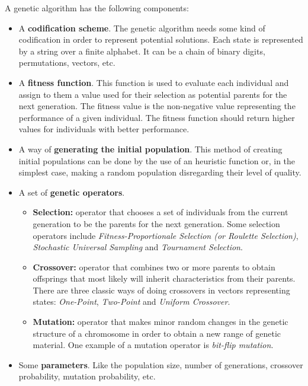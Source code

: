\documentclass[]{llncs}
\begin{document}
A genetic algorithm has the following components:
\begin{itemize}
    \item A \textbf{codification scheme}. The genetic algorithm needs some kind of codification in order to represent potential solutions. Each state is represented by a string over a finite alphabet. It can be a chain of binary digits, permutations, vectors, etc. 
    \item A \textbf{fitness function}. This function is used to evaluate each individual and assign to them a value used for their selection as potential parents for the next generation. The fitness value is the non-negative value representing the performance of a given individual. The fitness function should return higher values for individuals with better performance.
    \item A way of \textbf{generating the initial population}. This method of creating initial populations can be done by the use of an heuristic function or, in the simplest case, making a random population disregarding their level of quality.
    \item A set of \textbf{genetic operators}. 
    \begin{itemize}
        \item \textbf{Selection:} operator that chooses a set of individuals from the current generation to be the parents for the next generation. Some selection operators include \textit{Fitness-Proportionale Selection (or Roulette Selection)}, \textit{Stochastic Universal Sampling} and \textit{Tournament Selection}.
        \item \textbf{Crossover:} operator that combines two or more parents to obtain offsprings that most likely will inherit characteristics from their parents. There are three classic ways of doing crossovers in vectors representing states: \textit{One-Point}, \textit{Two-Point} and \textit{Uniform Crossover}.
        \item \textbf{Mutation:} operator that makes minor random changes in the genetic structure of a chromosome in order to obtain a new range of genetic material. One example of a mutation operator is \textit{bit-flip mutation}.
    \end{itemize}
    \item Some \textbf{parameters}. Like the population size, number of generations, crossover probability, mutation probability, etc.
\end{itemize}
\end{document}
